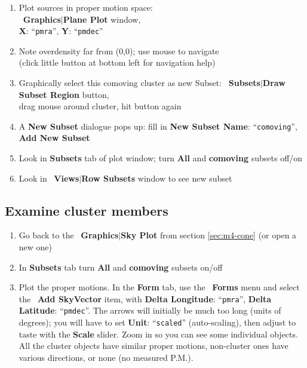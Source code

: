 \documentclass{article}
\newcommand{\buttimg}[1]
           {\mbox{\vtop{\vskip-2ex\hbox{\texttt{[image: \#1]}}}}}
\newcommand{\winfig}[2]
           {\vspace*{-0.5cm}
            \hspace*{0.5cm}\mbox{\vtop{\hbox{\texttt{[image: \#2]}}}}}
\newcommand{\lab}[1]{{\bf #1}}
\newcommand{\ma}[2]{\buttimg{#1}~\lab{#2}}
\newcommand{\mb}[3]{\buttimg{#1}~\lab{#2}$\mid$\lab{#3}}
\newcommand{\entry}[2]{\lab{#1}: ``{\tt #2}''}
\begin{document}
\begin{minipage}[t]{11cm}
  \raggedright
  \begin{enumerate}
  \item Plot sources in proper motion space: \\
        \mb{planeplot_button.png}{Graphics}{Plane Plot} window, \\
        \entry{X}{pmra}, \entry{Y}{pmdec}
  \item Note overdensity far from (0,0);
        use mouse to navigate \\
        (click little \buttimg{navig_help.png} button at bottom left
        for navigation help)
  \item Graphically select this comoving cluster as new Subset:
        \mb{blob_button.png}{Subsets}{Draw Subset Region} button, \\
        drag mouse around cluster, hit \buttimg{unblob_button} button again
  \item A \lab{New Subset} dialogue pops up:
        fill in \entry{New Subset Name}{comoving}, \lab{Add New Subset}
  \item Look in \lab{Subsets} tab of plot window;
        turn \lab{All} and \lab{comoving} subsets off/on
  \item Look in \mb{subsets_button.png}{Views}{Row Subsets} window
        to see new subset
  \end{enumerate}
\end{minipage}
\begin{minipage}[t]{8cm}
  \winfig{width=8cm}{m4_pmplot.png}
\end{minipage}

\subsection{Examine cluster members}

\begin{minipage}[t]{11cm}
  \raggedright
  \begin{enumerate}
  \item Go back to the \mb{skyplot_button.png}{Graphics}{Sky Plot}
        from section \ref{sec:m4-cone} (or open a new one)
  \item In \lab{Subsets} tab turn \lab{All} and \lab{comoving} subsets on/off
  \item Plot the proper motions.
        In the \lab{Form} tab, use the \ma{Plus1.png}{Forms} menu
        and select the \ma{ADD_FORM_VECTOR.png}{Add SkyVector} item,
        with \entry{Delta Longitude}{pmra},
             \entry{Delta Latitude}{pmdec}.
        The arrows will initially be much too long (units of degrees);
        you will have to set \entry{Unit}{scaled} (auto-scaling),
        then adjust to taste with the \lab{Scale} slider.
        Zoom in so you can see some individual objects.
        All the cluster objects have similar proper motions,
        non-cluster ones have various directions, or none (no measured P.M.).
  \end{enumerate}
\end{minipage}
\begin{minipage}[t]{8cm}
  \winfig{width=8cm}{m4-vector.png}
\end{minipage}
\end{document}
